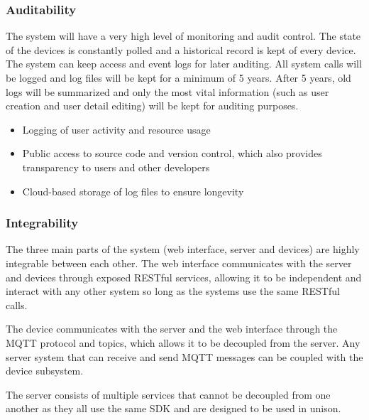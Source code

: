 \documentclass{article}
\begin{document}
		\subsubsection{Auditability}
			The system will have a very high level of monitoring and audit control. The state of the devices is constantly polled and a historical record is kept of every device. The system can keep access and event logs for later auditing. All system calls will be logged and log files will be kept for a minimum of 5 years. After 5 years, old logs will be summarized and only the most vital information (such as user creation and user detail editing) will be kept for auditing purposes.
			
			
			\begin{itemize}
				\item Logging of user activity and resource usage
				\item Public access to source code and version control, which also provides transparency to users and other developers
				\item Cloud-based storage of log files to ensure longevity
			\end{itemize}
			
		\subsubsection{Integrability}
			The three main parts of the system (web interface, server and devices) are highly integrable between each other. The web interface communicates with the server and devices through exposed RESTful services, allowing it to be independent and interact with any other system so long as the systems use the same RESTful calls.
			
			The device communicates with the server and the web interface through the MQTT protocol and topics, which allows it to be decoupled from the server. Any server system that can receive and send MQTT messages can be coupled with the device subsystem.
			
			The server consists of multiple services that cannot be decoupled from one another as they all use the same SDK and are designed to be used in unison.
\end{document}
